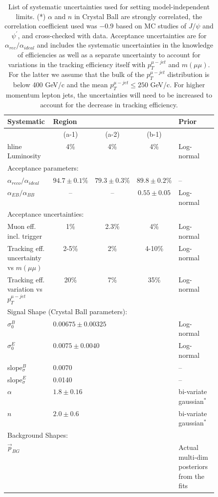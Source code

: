 \begin{table}[tbh]
\caption{List of systematic uncertainties used for setting model-independent limits. (*) $\alpha$ and $n$ in Crystal Ball are strongly correlated, the correlation coefficient used was $-0.9$ based on MC studies of $J/\psi$ and $\psi^\prime$, and cross-checked with data. Acceptance uncertainties are for $\alpha_{rec}/\alpha_{ideal}$ and includes the systematic uncertainties in the knowledge of efficiencies as well as a separate uncertainty to account for variations in the tracking efficiency itself with $p_T^{\mu-jet}$ and $m(\mu\mu)$. For the latter we assume that the bulk of the $p_T^{\mu-jet}$ distribution is below 400 GeV/c and the mean $p_T^{\mu-jet}\leq 250$ GeV/c. For higher momentum lepton jets, the uncertainties will need to be increased to account for the decrease in tracking efficiency.  \label{tab:syst_params_model_indep}}
\begin{center}
\begin{tabular}{| p{0.25\linewidth} | ccc|p{0.25\linewidth}|}
\hline\hline 
Systematic & \multicolumn{3}{|l|}{Region}              & Prior \\\hline
                  & (a-1) & (a-2) & (b-1) & \\hline
Luminosity  & 4\%  & 4\% & 4\% & Log-normal \\
\multicolumn{3}{|l|}{Acceptance parameters:} \\\hline
$\alpha_{reco}/\alpha_{ideal}$ & $94.7 \pm 0.1\%$ & $79.3 \pm 0.3\%$ & $89.8 \pm 0.2\%$ & -- \\\hline 
$\alpha_{EB}/\alpha_{BB}$ & -- & -- & $0.55 \pm 0.05$ & Log-normal \\
\multicolumn{5}{|l|}{Acceptance uncertainties:} \\\hline
Muon eff. incl. trigger & 1\%& 2.3\%& 4\%  & Log-normal \\
Tracking eff. uncertainty vs $m(\mu\mu)$ & 2-5\% & 2\% & 4-10\%  & Log-normal \\
Tracking eff. variation vs $p_T^{\mu-jet}$ & 20\% & 7\% & 35\%    &  Log-normal\\
\hline
\multicolumn{5}{|l|}{Signal Shape (Crystal Ball parameters):} \\\hline
$\sigma_0^B$ & \multicolumn{3}{|l|}{$0.00675\pm 0.00325$} & Log-normal \\
$\sigma_0^E$ & \multicolumn{3}{|l|}{$0.0075 \pm 0.0040$} & Log-normal \\
slope$^B_{\sigma}$  & \multicolumn{3}{|l|}{0.0070} &--\\
slope$^E_{\sigma}$  & \multicolumn{3}{|l|}{0.0140} & --\\
$\alpha$ & \multicolumn{3}{|l|}{$1.8 \pm 0.16$} & bi-variate gaussian$^*$ \\
$n$ & \multicolumn{3}{|l|}{$2.0 \pm 0.6$} & bi-variate gaussian$^*$ \\
\hline
\multicolumn{5}{|l|}{Background Shapes:} \\\hline
$\vec{p}_{BG}$ & \multicolumn{3}{|l|}{} & Actual multi-dim posteriors from the fits \\
\hline\hline 
\end{tabular}
\end{center}
\end{table}


